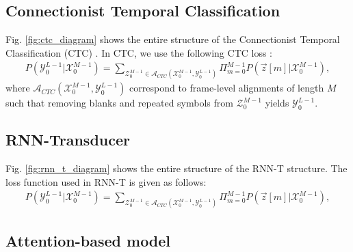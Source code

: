 \documentclass{article}
\begin{document}
\subsection{Connectionist Temporal Classification}
\label{sec:ctc}

Fig. \ref{fig:ctc_diagram} shows the entire structure of the 
Connectionist Temporal Classification (CTC) 
\cite{a_graves_icml_2006_00}. In CTC, we use the following CTC loss
\cite{a_graves_icml_2006_00, y_he_icassp_2019_00}:
\begin{align}
  P\left(\mathcal{Y}_{0}^{L-1} | \mathcal{X}_{0}^{M-1}\right) = 
    \sum_{\mathcal{Z}_{0}^{M-1} \in 
      \mathcal{A}_{CTC} 
        \left(\mathcal{X}_{0}^{M-1}, \mathcal{Y}_{0}^{L-1} \right)}
          \Pi_{m=0}^{M-1}
            P\left(\vec{z}[m] | \mathcal{X}_{0}^{M-1} \right),
\end{align}
where $\mathcal{A}_{CTC} \left(\mathcal{X}_{0}^{M-1}, 
\mathcal{Y}_{0}^{L-1} \right)$ correspond to frame-level alignments
of length $M$ such that removing blanks and repeated symbols from 
$\mathcal{Z}_{0}^{M-1}$ yields $\mathcal{Y}_{0}^{L-1}$.


\subsection{RNN-Transducer}
\label{sec:rnn_t}

Fig. \ref{fig:rnn_t_diagram} shows the entire structure of the  
RNN-T structure. The loss function used in RNN-T is given as follows:
\begin{align}
  P\left(\mathcal{Y}_{0}^{L-1} | \mathcal{X}_{0}^{M-1}\right) = 
    \sum_{\mathcal{Z}_{0}^{M-1} \in 
      \mathcal{A}_{CTC} 
        \left(\mathcal{X}_{0}^{M-1}, \mathcal{Y}_{0}^{L-1} \right)}
          \Pi_{m=0}^{M-1}
            P\left(\vec{z}[m] | \mathcal{X}_{0}^{M-1} \right),
\end{align}

\subsection{Attention-based model}
\label{sec:attention_based_model}
\end{document}
